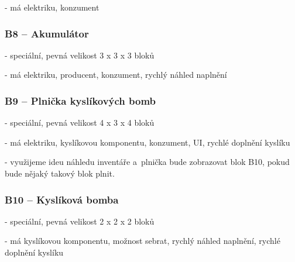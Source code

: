 - má elektriku, konzument
\subsubsection{B8 -- Akumulátor}
- speciální, pevná velikost 3 x 3 x 3 bloků

- má elektriku, producent, konzument, rychlý náhled naplnění
\subsubsection{B9 -- Plnička kyslíkových bomb}
- speciální, pevná velikost 4 x 3 x 4 bloků

- má elektriku, kyslíkovou komponentu, konzument, UI, rychlé doplnění kyslíku

- využijeme ideu náhledu inventáře a~plnička bude zobrazovat blok B10, pokud bude nějaký takový blok plnit.

\subsubsection{B10 -- Kyslíková bomba}
- speciální, pevná velikost 2 x 2 x 2 bloků

- má kyslíkovou komponentu, možnost sebrat, rychlý náhled naplnění, rychlé doplnění kyslíku


